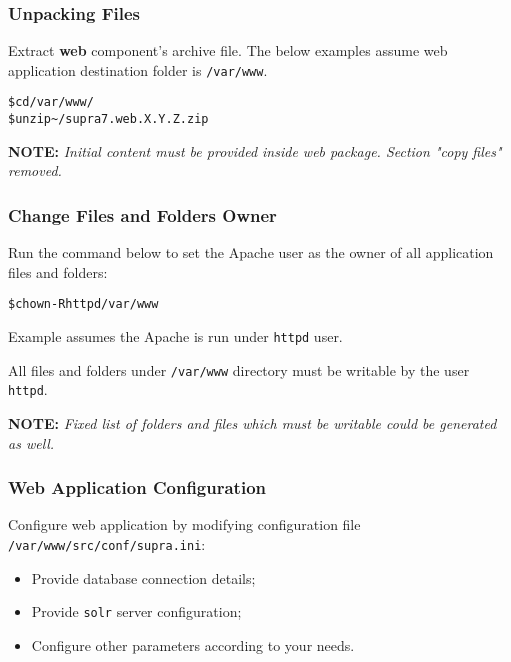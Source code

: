 \documentclass[12pt]{article}
\newcommand{\vigShowNotes}{1}
\newcommand{\vigPackageName}{supra7}
\newcommand{\vigPathToProject}{/var/www}
\newcommand{\vigPathToSrc}{/src}
\newcommand{\vigReleasePath}{\textasciitilde/}
\newcommand{\vigReleaseVersion}{X.Y.Z}
\newcommand{\note}[1]{
\textbf{NOTE:} 
\textit{#1}
}
\begin{document}
\subsubsection{Unpacking Files}

Extract \textbf{web} component's archive file. The below examples assume web application destination folder is \texttt{{\vigPathToProject}}.

\begin{alltt}
\$ cd \vigPathToProject/
\$ unzip {\vigReleasePath}{\vigPackageName}.web.\vigReleaseVersion.zip
\end{alltt}

\note{Initial content must be provided inside web package. Section "copy files" removed.}

\subsubsection{Change Files and Folders Owner\label{fileOwnerSection}}

Run the command below to set the Apache user as the owner of all application files and folders:

\begin{alltt}
\$ chown -R httpd \vigPathToProject
\end{alltt}

Example assumes the Apache is run under \texttt{httpd} user.

All files and folders under \texttt{\vigPathToProject} directory must be writable by the user \texttt{httpd}.

\note{Fixed list of folders and files which must be writable could be generated as well.}

\subsubsection{Web Application Configuration}
Configure web application by modifying configuration file \texttt{\vigPathToProject\vigPathToSrc/conf/supra.ini}:

\begin{itemize}
	\item Provide database connection details;
	\item Provide \texttt{solr} server configuration;
	\item Configure other parameters according to your needs.
\end{itemize}
\end{document}
